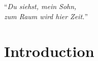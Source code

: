 
\section*{}

\begin{minipage}[t]{.48\textwidth}
  \vspace{0pt}

\end{minipage}
\hfill
\begin{minipage}[t]{.48\textwidth}
  \begin{flushright}
    ``\emph{Du siehst, mein Sohn,\\
      zum Raum wird hier Zeit.}''
  \end{flushright}
\end{minipage}
\vspace{1cm}


\section*{Introduction}
\label{sec:introduction}

